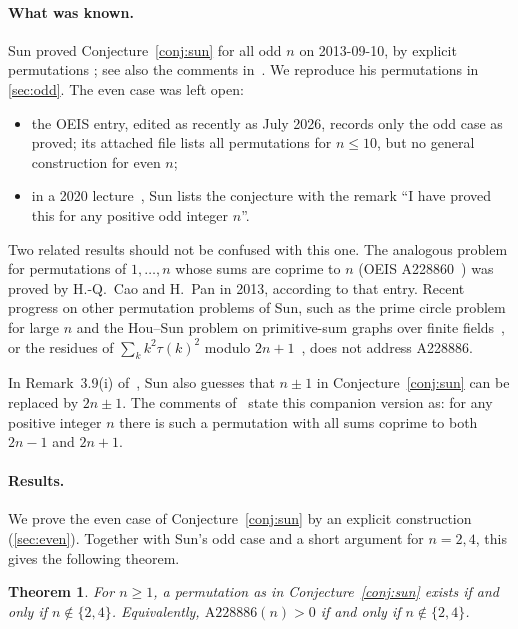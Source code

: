 \documentclass[11pt]{article}
\numberwithin{equation}{section}
\newtheorem{theorem}{Theorem}[section]
\theoremstyle{definition}
\theoremstyle{remark}
\begin{document}
\paragraph{What was known.}
Sun proved Conjecture~\ref{conj:sun} for all odd $n$ on 2013-09-10, by explicit permutations
\cite[Remark~3.9(ii)]{Sun1309}; see also the comments in~\cite{A228886}. We reproduce his
permutations in \cref{sec:odd}. The even case was left open:
\begin{itemize}
  \item the OEIS entry, edited as recently as July 2026, records only the odd case as proved; its
  attached file lists all permutations for $n\le10$, but no general construction for even $n$;
  \item in a 2020 lecture~\cite{SunTalk2020}, Sun lists the conjecture with the remark ``I have
  proved this for any positive odd integer $n$''.
\end{itemize}

Two related results should not be confused with this one. The analogous problem for permutations of
$1,\dots,n$ whose sums are coprime to $n$ (OEIS A228860~\cite{A228860}) was proved by H.-Q.~Cao and
H.~Pan in 2013, according to that entry. Recent progress on other permutation problems of Sun, such as
the prime circle problem for large $n$ and the Hou--Sun problem on primitive-sum graphs over finite
fields~\cite{She2609}, or the residues of $\sum_k k^2\tau(k)^2$ modulo $2n+1$~\cite{She2606},
does not address A228886.

In Remark~3.9(i) of~\cite{Sun1309}, Sun also guesses that $n\pm1$ in Conjecture~\ref{conj:sun} can be
replaced by $2n\pm1$. The comments of~\cite{A228886} state this companion version as: for any
positive integer $n$ there is such a permutation with all sums coprime to both $2n-1$ and $2n+1$.

\paragraph{Results.}
We prove the even case of Conjecture~\ref{conj:sun} by an explicit construction
(\cref{sec:even}). Together with Sun's odd case and a short argument for $n=2,4$, this gives the
following theorem.

\begin{theorem}\label{thm:main}
For $n\ge1$, a permutation as in Conjecture~\ref{conj:sun} exists if and only if $n\notin\{2,4\}$.
Equivalently, $\mathrm{A228886}(n)>0$ if and only if $n\notin\{2,4\}$.
\end{theorem}
\end{document}
